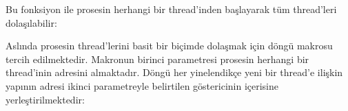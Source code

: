 \documentclass[a4paper,10pt,turkish]{sphinxmanual}
\begin{document}
\sphinxAtStartPar
Bu fonksiyon ile prosesin herhangi bir thread’inden başlayarak tüm thread’leri dolaşılabilir:

\begin{sphinxVerbatim}[commandchars=\\\{\}]



\end{sphinxVerbatim}

\sphinxAtStartPar
Aslında prosesin thread’lerini basit bir biçimde dolaşmak için  döngü makrosu tercih
edilmektedir. Makronun birinci parametresi prosesin herhangi bir thread’inin  adresini
almaktadır. Döngü her yinelendikçe yeni bir thread’e ilişkin  yapının adresi ikinci
parametreyle belirtilen göstericinin içerisine yerleştirilmektedir:

\begin{sphinxVerbatim}[commandchars=\\\{\}]

\end{sphinxVerbatim}
\end{document}
